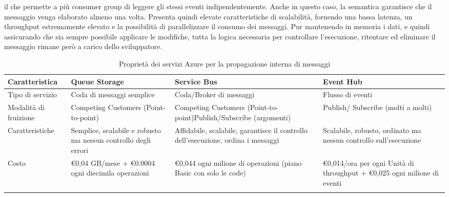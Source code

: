 il che permette a più consumer group di leggere gli stessi eventi indipendentemente.
Anche in questo caso, la semantica garantisce che il messaggio venga elaborato almeno una volta.
Presenta quindi elevate caratteristiche di scalabilità,
fornendo una bassa latenza, un throughput estremamente elevato
e la possibilità di parallelizzare il consumo dei messaggi.
Pur mantenendo in memoria i dati,
e quindi assicurando che sia sempre possibile applicare le modifiche,
tutta la logica necessaria per controllare l'esecuzione, ritentare ed eliminare il messaggio
rimane però a carico dello sviluppatore.\\
\begin{longtable}{|P{2.9cm}|P{3.9cm}|P{3.9cm}|P{3.9cm}|}
    \hline
    \textbf{Caratteristica} & \textbf{Queue Storage}                                         & \textbf{Service Bus}                                                              & \textbf{Event Hub}                                                      \\
    \hline
    Tipo di servizio        & Coda di messaggi semplice                                      & Coda/Broker di messaggi                                                           & Flusso di eventi                                                        \\
    \hline
    Modalità di fruizione   & Competing Customers (Point-to-point)                           & Competing Customers (Point-to-point)\newline Publish/Subscribe (argomenti)        & Publish/ Subscribe (molti a molti)                                      \\
    \hline
    Caratteristiche         & Semplice, scalabile e robusto ma nessun controllo degli errori & Affidabile, scalabile, garantisce il controllo dell'esecuzione, ordina i messaggi & Scalabile, robusto, ordinato ma nessun controllo sull'esecuzione        \\
    \hline
    Costo                   & €0,04 GB/mese + €0.0004 ogni diecimila operazioni              & €0,044 ogni milione di operazioni (piano Basic con solo le code)                  & €0,014/ora per ogni Unità di throughput + €0,025 ogni milione di eventi \\
    \hline
    \caption{Proprietà dei servizi Azure per la propagazione interna di messaggi }
\end{longtable}

